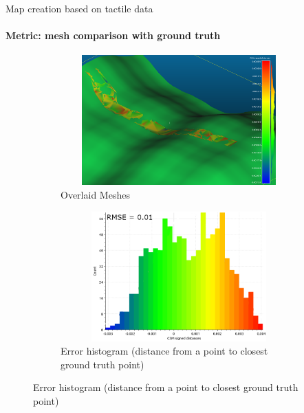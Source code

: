 \documentclass[aspectratio=169,xcolor=table]{beamer}
\begin{document}
\begin{frame}[t]{Map creation based on tactile data}
    \framesubtitle{Metric: mesh comparison with ground truth}
    \vspace{-15pt}
    \begin{figure}[H]
        \begin{subfigure}[t]{0.49\textwidth}
            \centering\includegraphics[height=5cm,width=1\textwidth,keepaspectratio]{mesh_comp.png}
            \caption*{Overlaid Meshes}
        \end{subfigure}
        \begin{subfigure}[t]{0.49\textwidth}
            \centering\includegraphics[height=5cm,width=1\textwidth,keepaspectratio]{mesh_hist.png}
            \caption*{Error histogram (distance from a point to closest ground truth point)}
        \end{subfigure}
    \end{figure}
\end{frame}
\end{document}
